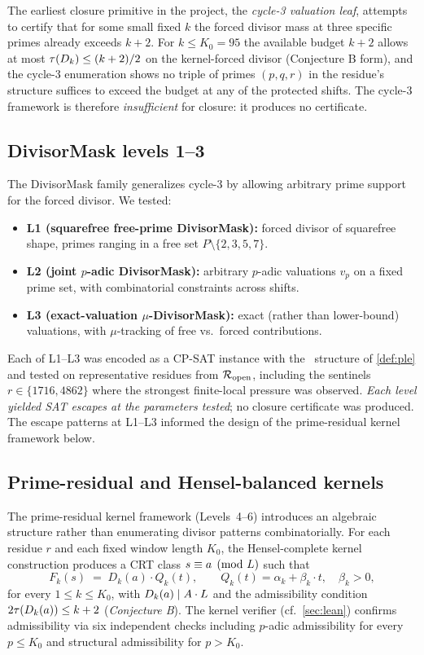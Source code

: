 The earliest closure primitive in the project, the
\emph{cycle-3 valuation leaf}, attempts to certify that for some
small fixed $k$ the forced divisor mass at three specific primes
already exceeds $k + 2$. For
$k \le K_0 = 95$ the available budget $k + 2$ allows at most
$\tau(D_k) \le (k+2)/2$ on the kernel-forced divisor (Conjecture B
form), and the cycle-3 enumeration shows no triple of primes
$(p, q, r)$ in the residue's structure suffices to exceed the budget
at any of the protected shifts. The cycle-3 framework is therefore
\emph{insufficient} for closure: it produces no certificate.

\subsection{DivisorMask levels 1--3}
\label{sec:divisormask-audit}

The DivisorMask family generalizes cycle-3 by allowing arbitrary
prime support for the forced divisor. We tested:

\begin{itemize}[leftmargin=*]
\item \textbf{L1 (squarefree free-prime DivisorMask):} forced divisor
  of squarefree shape, primes ranging in a free set
  $P \setminus \{2, 3, 5, 7\}$.
\item \textbf{L2 (joint $p$-adic DivisorMask):} arbitrary $p$-adic
  valuations $v_p$ on a fixed prime set, with combinatorial
  constraints across shifts.
\item \textbf{L3 (exact-valuation $\mu$-DivisorMask):} exact (rather
  than lower-bound) valuations, with $\mu$-tracking of free vs.\
  forced contributions.
\end{itemize}

Each of L1--L3 was encoded as a CP-SAT instance with the
\PLEclass\ structure of \cref{def:ple} and tested on representative
residues from $\mathcal{R}_{\mathrm{open}}$, including the sentinels $r \in \{1716, 4862\}$
where the strongest finite-local pressure was observed. \emph{Each
level yielded SAT escapes at the parameters tested}; no closure
certificate was produced. The escape patterns at L1--L3 informed
the design of the prime-residual kernel framework below.

\subsection{Prime-residual and Hensel-balanced kernels}
\label{sec:hensel-kernel-audit}

The prime-residual kernel framework (Levels~4--6) introduces an
algebraic structure rather than enumerating divisor patterns
combinatorially. For each residue $r$ and each fixed window length
$K_0$, the Hensel-complete kernel construction produces a CRT class
$s \equiv a \pmod{L}$ such that
\[
F_k(s) \;=\; D_k(a) \cdot Q_k(t), \qquad
Q_k(t) = \alpha_k + \beta_k \cdot t, \quad \beta_k > 0,
\]
for every $1 \le k \le K_0$, with $D_k(a) \mid A \cdot L$
and the admissibility condition $2 \tau(D_k(a)) \le k + 2$
(\emph{Conjecture B}). The kernel verifier (cf.\
\cref{sec:lean}) confirms admissibility via six independent checks
including $p$-adic admissibility for every $p \le K_0$ and structural
admissibility for $p > K_0$.

